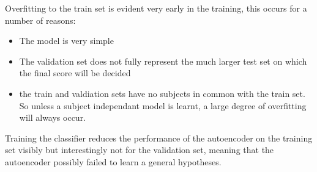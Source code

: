     Overfitting to the train set is evident very early in the training, this
    occurs for a number of reasons:
    \begin{itemize}
      \item The model is very simple
      \item The validation set does not fully represent the much larger test set on which the final score will be decided
      \item the train and valdiation sets have no subjects in common with the train set.
            So unless a subject independant model is learnt, a large degree of overfitting will always occur.
    \end{itemize}

    Training the classifier reduces the performance of the autoencoder on the
    training set visibly but interestingly not for the validation set, meaning
    that the autoencoder possibly failed to learn a general hypotheses.


